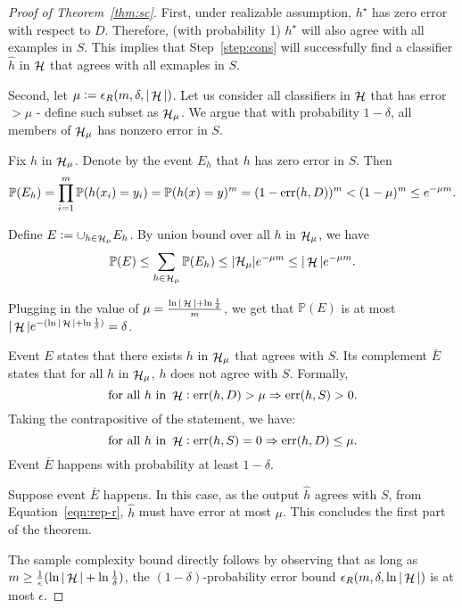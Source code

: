 \documentclass{article}
\DeclareMathOperator*{\err}{{\rm err}}
\DeclareMathOperator*{\Hcal}{{\cal H}}
\newcommand{\PP}{\mathbb{P}}
\begin{document}
\begin{proof}[Proof of Theorem~\ref{thm:sc}]

  First, under realizable assumption, $h^\star$ has zero error with respect to $D$. Therefore, (with probability 1) $h^\star$ will also agree with all examples in $S$.
  This implies that Step~\ref{step:cons} will successfully find a classifier $\hat{h}$ in
  $\Hcal$ that agrees with all exmaples in $S$.

  Second, let $\mu:= \epsilon_R(m,\delta,|\Hcal|)$. Let us consider all classifiers in $\Hcal$ that has error $> \mu$ - define such subset as $\Hcal_\mu$. We argue that with probability $1-\delta$, all members of $\Hcal_\mu$ has nonzero error in $S$.

  Fix $h$ in $\Hcal_\mu$. Denote by the event $E_h$ that $h$ has zero error in $S$. Then
  \[ \PP(E_h) = \prod_{i=1}^m \PP(h(x_i) = y_i) = \PP(h(x) = y)^m = (1 - \err(h, D))^m < (1 - \mu)^m
  \leq e^{-\mu m}. \]

  Define $E := \cup_{h \in \Hcal_\mu} E_h$.
  By union bound over all $h$ in $\Hcal_\mu$, we have
  \[ \PP(E) \leq \sum_{h \in \Hcal_\mu} \PP(E_h) \leq |\mathcal{H}_{\mu}| e^{-\mu m} \leq |\Hcal| e^{-\mu m}. \]

  Plugging in the value of $\mu = \frac{\ln|\Hcal| + \ln\frac{1}{\delta}}{m}$, we get that $\PP(E)$ is at most $|\Hcal| e^{-(\ln|\Hcal| + \ln\frac{1}{\delta})} = \delta$.

  Event $E$ states that there exists $h$ in $\Hcal_\mu$ that agrees with $S$. Its complement $\bar{E}$ states that for all $h$ in $\Hcal_\mu$, $h$ does not agree with $S$. Formally,
  \[ \text{for all } h \text{ in } \Hcal: \err(h, D) > \mu \Rightarrow \err(h,S) > 0. \]
  Taking the contrapositive of the statement, we have:
  \begin{equation}
  \text{for all } h \text{ in } \Hcal: \err(h, S) = 0 \Rightarrow \err(h,D) \leq \mu.
  \label{eqn:rep-r}
  \end{equation}
  Event $\bar{E}$ happens with probability at least $1-\delta$.

  Suppose event $\bar{E}$ happens. In this case, as the output $\hat{h}$ agrees with $S$, from Equation~\eqref{eqn:rep-r}, $\hat{h}$ must have error at most $\mu$. This concludes the first part of the theorem.

  The sample complexity bound directly follows by observing that as long as $m \geq \frac{1}{\epsilon}(\ln|\Hcal| + \ln\frac{1}{\delta})$,
  the $(1-\delta)$-probability error bound $\epsilon_R(m, \delta, \ln|\Hcal|)$ is at most $\epsilon$.
\end{proof}
\end{document}
